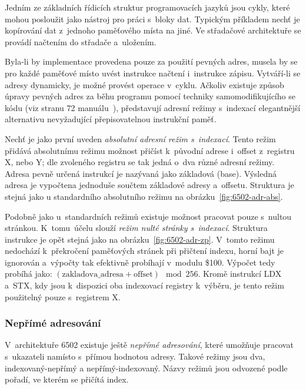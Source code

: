 \begin{example}
Jedním ze základních řídicích struktur programovacích jazyků jsou cykly, které mohou posloužit jako nástroj pro práci s~bloky dat. Typickým příkladem nechť je kopírování dat z~jednoho paměťového místa na jiné. Ve střadačové architektuře se provádí načtením do střadače a~uložením.

Byla-li by implementace provedena pouze za použití pevných adres, musela by se pro každé paměťové místo uvést instrukce načtení i~instrukce zápisu. Vytváří-li se adresy dynamicky, je možné provést operace v~cyklu. Ačkoliv existuje způsob úpravy pevných adres za běhu programu pomocí techniky samomodifikujícího se kódu (viz stranu 72 manuálu~), představují adresní režimy s~indexací elegantnější alternativu nevyžadující přepisovatelnou instrukční paměť.
\end{example}

Nechť je jako první uveden \emph{absolutní adresní režim s~indexací}. Tento režim přidává absolutnímu režimu možnost přičíst k~původní adrese i~offset z~registru X, nebo Y; dle zvoleného registru se tak jedná o~dva různé adresní režimy. Adresa pevně určená instrukcí je nazývaná jako základová (base). Výsledná adresa je vypočtena jednoduše součtem základové adresy a~offsetu. Struktura je stejná jako u standardního absolutního režimu na obrázku~\ref{fig:6502-adr-abs}.

Podobně jako u~standardních režimů existuje možnost pracovat pouze s~nultou stránkou. K~tomu~účelu slouží \emph{režim nulté stránky s~indexací}. Struktura instrukce je opět stejná jako na obrázku~\ref{fig:6502-adr-zp}. V~tomto režimu nedochází k~překročení paměťových stránek při přičtení indexu, horní bajt je ignorován a~výpočty tak efektivně probíhají v~modulu \$100. Výpočet tedy probíhá jako: $(\textrm{zakladova\_adresa} + \textrm{offset}) \mod 256$. Kromě instrukcí LDX a~STX, kdy jsou k~dispozici oba indexovací registry k~výběru, je tento režim použitelný pouze s~registrem X.

\subsubsection{Nepřímé adresování}
V~architektuře 6502 existuje ještě \emph{nepřímé adresování}, které umožňuje pracovat s~ukazateli namísto s~přímou hodnotou adresy. Takové režimy jsou dva, indexovaný-nepřímý a nepřímý-indexovaný. Názvy režimů jsou odvozené podle pořadí, ve kterém se přičítá index.

